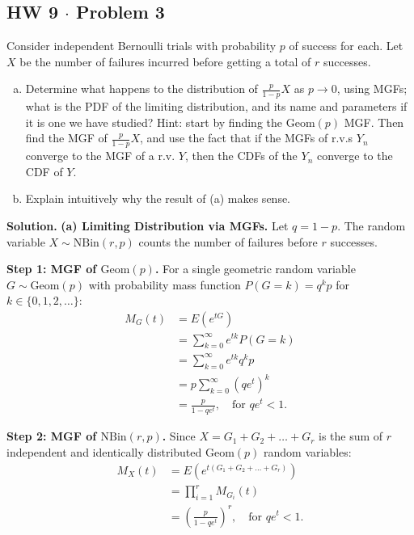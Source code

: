 \documentclass[11pt,a4paper]{article}
\begin{document}
\subsection{HW 9 $\cdot$ Problem 3}
\begin{tcolorbox}[title={HW 9 $\cdot$ Problem 3}]
Consider independent Bernoulli trials with probability $p$ of success for each. Let $X$ be the number of failures incurred before getting a total of $r$ successes.
\begin{enumerate}[(a)]
\item Determine what happens to the distribution of $\frac{p}{1-p}X$ as $p \to 0$, using MGFs; what is the PDF of the limiting distribution, and its name and parameters if it is one we have studied?
Hint: start by finding the $\text{Geom}(p)$ MGF. Then find the MGF of $\frac{p}{1-p}X$, and use the fact that if the MGFs of r.v.s $Y_n$ converge to the MGF of a r.v. $Y$, then the CDFs of the $Y_n$ converge to the CDF of $Y$.
\item Explain intuitively why the result of (a) makes sense.
\end{enumerate}
\end{tcolorbox}

\noindent \textbf{Solution.} \textbf{(a) Limiting Distribution via MGFs.} Let $q = 1 - p$. The random variable $X \sim \text{NBin}(r, p)$ counts the number of failures before $r$ successes.

\vspace{4pt}
\noindent \textbf{Step 1: MGF of $\text{Geom}(p)$.} For a single geometric random variable $G \sim \text{Geom}(p)$ with probability mass function $P(G=k) = q^k p$ for $k \in \{0, 1, 2, \dots\}$:
\begin{align*}
M_G(t) &= E\left( e^{tG} \right) \\
&= \sum_{k=0}^{\infty} e^{tk} P(G=k) \\
&= \sum_{k=0}^{\infty} e^{tk} q^k p \\
&= p \sum_{k=0}^{\infty} \left( q e^t \right)^k \\
&= \frac{p}{1 - q e^t}, \quad \text{for } q e^t < 1.
\end{align*}

\noindent \textbf{Step 2: MGF of $\text{NBin}(r, p)$.} Since $X = G_1 + G_2 + \dots + G_r$ is the sum of $r$ independent and identically distributed $\text{Geom}(p)$ random variables:
\begin{align*}
M_X(t) &= E\left( e^{t(G_1 + G_2 + \dots + G_r)} \right) \\
&= \prod_{i=1}^{r} M_{G_i}(t) \\
&= \left( \frac{p}{1 - q e^t} \right)^r, \quad \text{for } q e^t < 1.
\end{align*}
\end{document}
